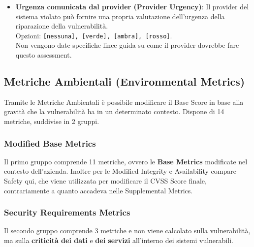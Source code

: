 \documentclass{article}
\begin{document}
\begin{itemize}
	\item \textbf{Urgenza comunicata dal provider (Provider Urgency)}: Il provider del sistema violato può fornire una propria valutazione dell’urgenza della riparazione della vulnerabilità.\\ Opzioni: \verb|[nessuna], [verde], [ambra], [rosso]|. \\
	Non vengono date specifiche linee guida su come il provider dovrebbe
	fare questo assessment.
\end{itemize}

\newpage

\subsection{Metriche Ambientali (Environmental Metrics)}
Tramite le Metriche Ambientali è possibile modificare il Base Score in base alla gravità che la vulnerabilità ha in un determinato contesto. Dispone di 14 metriche, suddivise in 2 gruppi.

\subsubsection{Modified Base Metrics}
Il primo gruppo comprende 11 metriche, ovvero le \textbf{Base Metrics} modificate nel contesto dell'azienda. Inoltre per le Modified Integrity e Availability compare Safety qui, che viene utilizzata per modificare il CVSS Score finale, contrariamente a quanto accadeva nelle Supplemental Metrics.

\subsubsection{Security Requirements Metrics}
Il secondo gruppo comprende 3 metriche e non viene calcolato sulla vulnerabilità, ma sulla \textbf{criticità dei dati} e \textbf{dei servizi} all’interno dei sistemi vulnerabili.
\end{document}
